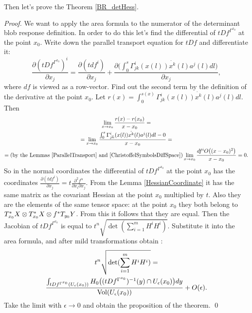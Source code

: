 \documentclass[twocolumn]{svjour3}          %
\newcommand{\Vol}{\mathop{\rm Vol}}
\newcommand{\Ueps}{U_{\epsilon}}
\newcommand{\TangentSpaceArg}[2]{{T_{#2}}{#1}}
\newcommand{\CotangentSpaceArg}[2]{\tensor*{T}{^{*}_{#2}}{#1}}
\newcommand {\Preimage}[2]{{#2}^*{#1}}
\newcommand \TArgPreimage[3]{\Preimage{\TangentSpaceArg{#1}{#2}}{#3}}
\begin{document}
Then let's prove the Theorem \ref{BR_detHess}.
\begin{proof}
We want to apply the area formula to the numerator of the determinant blob response definition. In order to do this let's find the differential of $tDf^{\Gamma^{x_0}}$ at the point $x_0$. Write down the parallel transport equation for $tDf$ and differentiate it:
$$\frac{\partial (tDf^{\Gamma^{x_0}})^i}{\partial x_j} = \frac{\partial (tdf^i)}{\partial x_j} 
+ \frac{\partial \Big(\int_0^s \Gamma^i_{jk}(x(l))\dot{x^k}(l)a^j(l)dl\Big)}{\partial x_j},$$
where $df$ is viewed as a row-vector.
Find out the second term by the definition of the derivative at the point $x_0$. Let $r(x) = \int_0^{s(x)} \Gamma^i_{jk}(x(l))\dot{x^k}(l)a^j(l)dl$. Then
\begin{multline*} \lim_{x \to x_0} \frac{r(x) - r(x_0)}{x - x_0} = \\
= \lim_{x \to x_0} \frac{\int_0^s \Gamma^i_{jk}(x(l))\dot{x^k}(l)a^j(l)dl - 0}{x - x_0} = \\
= \textrm{(by the Lemmas \ref{ParallelTransport} and \ref{ChristoffelSymbolsDiffSpace})} \lim_{x \to x_0} \frac{df^i O \big((x-x_0)^2 \big)}{x-x_0} = 0.
\end{multline*} 
So in the normal coordinates the differential of $tDf^{\Gamma^{x_0}}$ at the point $x_0$ has the coordinates $\frac{\partial (tdf^l)}{\partial x_j} = t\frac{\partial^2 f^{\alpha}}{\partial x_i \partial x_j}$. From the Lemma \ref{HessianCoordinate} it has the same matrix as the covariant Hessian at the point $x_0$ multiplied by $t$. Also they are the elements of the same tensor space: at the point $x_0$ they both belong to $\CotangentSpaceArg{X}{x_0}\otimes \CotangentSpaceArg{X}{x_0}\otimes \TArgPreimage{Y}{y_0}{f}$. From this it follows that they are equal. Then the Jacobian of $tDf^{\Gamma^{x_0}}$ is equal to
$t^n\sqrt{\det (\sum_{i=1}^{m} H^i H^i)}$. Substitute it into the area formula, and after mild transformations obtain :
\begin{multline*} t^n\sqrt{\det (\sum_{i=1}^{m} H^i H^i)} = 
\\
\frac{
		\int_{tDf^{\Gamma^{x_0}}(\Ueps(x_0))} H_0 \big((tDf^{\Gamma^{x_0}})^{-1}(y) \cap \Ueps(x_0) \big) dy} 
		{\Vol(\Ueps(x_0))} + O(\epsilon).\end{multline*}
Take the limit with $\epsilon \to 0$ and obtain the proposition of the theorem. \qed
\end{proof}
\end{document}
